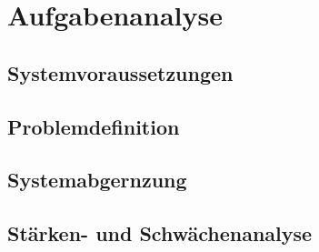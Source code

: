 \section{Aufgabenanalyse}

\subsection{Systemvoraussetzungen}

\subsection{Problemdefinition}

\subsection{Systemabgernzung}

\subsection{Stärken- und Schwächenanalyse}
